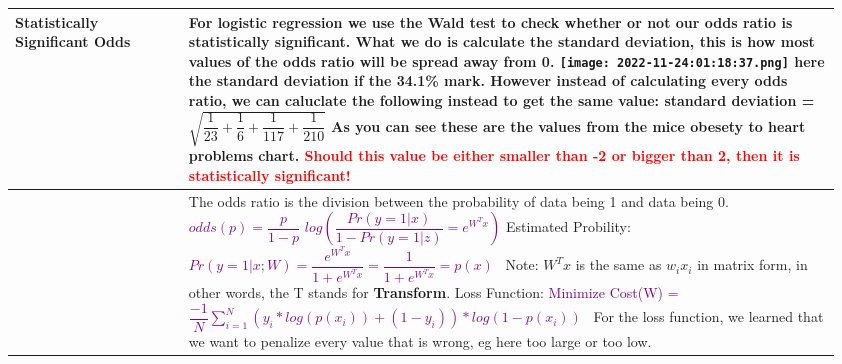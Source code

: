 \documentclass[main.tex,fontsize=8pt,paper=a4,paper=portrait,DIV=calc,]{scrartcl}
\begin{document}
\begin{table}[ht!]
\begin{tabular}{|m{0.2\linewidth}|m{0.755\linewidth}|}
\hline
Statistically Significant Odds & 
For logistic regression we use the \textbf{Wald test} to check whether or not our odds ratio is statistically significant.\newline
What we do is calculate the \textbf{standard deviation},  this is how most values of the \textbf{odds ratio} will be spread away from 0.\newline
\texttt{[image: 2022-11-24:01:18:37.png]}\newline
here the standard deviation if the 34.1\% mark.\newline
However instead of calculating every odds ratio, we can caluclate the following instead to get the same value:\newline
\large standard deviation = \( \sqrt{\dfrac{1}{23} + \dfrac{1}{6} + \dfrac{1}{117} + \dfrac{1}{210}} \)\newline
\normalsize As you can see these are the values from the mice obesety to heart problems chart.\newline 
\textcolor{red}{Should this value be either \textbf{smaller than -2 or bigger than 2, then it is statistically significant!}}
\\
\hline
&
The odds ratio is the division between the probability of data being 1 and data being 0.\newline
\large \textcolor{purple}{\( odds(p) = \dfrac{p}{1-p} \)}\newline
\large \textcolor{purple}{\( log ( \dfrac{Pr(y=1|x)}{1-Pr(y=1|z)} = e^{W^{T}x} ) \)}\newline
Estimated Probility:\newline
\large \textcolor{purple}{\( Pr(y=1|x;W) = \dfrac{e^{W^T x}}{1+e^{W^T x}} = \dfrac{1}{1 + e^{W^T x}} = p(x) \)}\newline
\normalsize \, \newline
Note: \( W^T x \) is the same as \( w_ix_i \) in matrix form, in other words, the T stands for \textbf{Transform}.\newline
\large Loss Function:\newline
\textcolor{purple}{Minimize Cost(W) =\( \dfrac{-1}{N}\sum^{N}_{i=1}(y_i * log(p(x_i)) + (1-y_i)) * log(1 - p(x_i)) \) }\newline 
\normalsize \, \newline
For the loss function, we learned that we want to penalize every value that is wrong, eg here too large or too low.\newline

\end{tabular}
\end{table}
\end{document}
